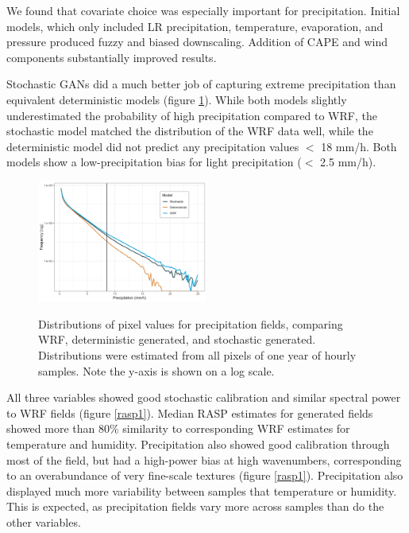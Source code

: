 \documentclass{ametsocV6.1}
\begin{document}
We found that covariate choice was especially important for precipitation. Initial models, which only included LR precipitation, temperature, evaporation, and pressure produced fuzzy and biased downscaling. Addition of CAPE and wind components substantially improved results. 

Stochastic GANs did a much better job of capturing extreme precipitation than equivalent deterministic models (figure \ref{precipdistr}). While both models slightly underestimated the probability of high precipitation compared to WRF, the stochastic model matched the distribution of the WRF data well, while the deterministic model did not predict any precipitation values $<$ 18 mm/h. Both models show a low-precipitation bias for light precipitation ($<$ 2.5 mm/h).
\begin{figure}[H]
  \noindent\includegraphics[width=0.5\textwidth,angle=0]{final/Precip_Distr.png}\\
  \caption{Distributions of pixel values for precipitation fields, comparing WRF, deterministic generated, and stochastic generated. Distributions were estimated from all pixels of one year of hourly samples. Note the y-axis is shown on a log scale. }\label{precipdistr}
\end{figure}
All three variables showed good stochastic calibration and similar spectral power to WRF fields (figure \ref{rasp1}). Median RASP estimates for generated fields showed more than 80\% similarity to corresponding WRF estimates for temperature and humidity. Precipitation also showed good calibration through most of the field, but had a high-power bias at high wavenumbers, corresponding to an overabundance of very fine-scale textures (figure \ref{rasp1}). Precipitation also displayed much more variability between samples that temperature or humidity. This is expected, as precipitation fields vary more across samples than do the other variables. 
\end{document}
